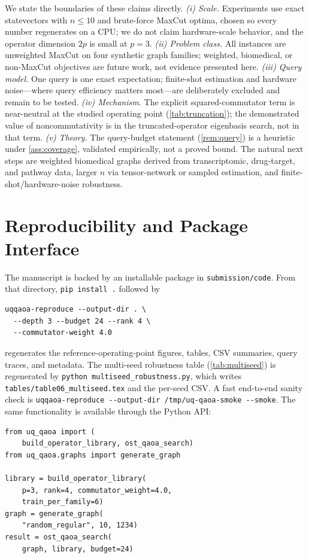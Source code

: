 \documentclass[aps,prresearch,reprint,amsmath,amssymb,floatfix,nofootinbib,superscriptaddress,longbibliography]{revtex4-2}
\theoremstyle{remark}
\begin{document}
We state the boundaries of these claims directly.
\emph{(i) Scale.}  Experiments use exact statevectors with \(n\le10\) and
brute-force MaxCut optima, chosen so every number regenerates on a CPU; we do not
claim hardware-scale behavior, and the operator dimension \(2p\) is small at
\(p{=}3\).
\emph{(ii) Problem class.}  All instances are unweighted MaxCut on four synthetic
graph families; weighted, biomedical, or non-MaxCut objectives are future work,
not evidence presented here.
\emph{(iii) Query model.}  One query is one exact expectation; finite-shot
estimation and hardware noise---where query efficiency matters most---are
deliberately excluded and remain to be tested.
\emph{(iv) Mechanism.}  The explicit squared-commutator term is near-neutral at
the studied operating point (\cref{tab:truncation}); the demonstrated value of
noncommutativity is in the truncated-operator eigenbasis search, not in that
term.
\emph{(v) Theory.}  The query-budget statement (\cref{rem:query}) is a heuristic
under \cref{ass:coverage}, validated empirically, not a proved bound.
The natural next steps are weighted biomedical graphs derived from
transcriptomic, drug-target, and pathway data, larger \(n\) via tensor-network or
sampled estimation, and finite-shot/hardware-noise robustness.

\section{Reproducibility and Package Interface}

The manuscript is backed by an installable package in \texttt{submission/code}.
From that directory, \texttt{pip install .} followed by
\begin{verbatim}
uqqaoa-reproduce --output-dir . \
  --depth 3 --budget 24 --rank 4 \
  --commutator-weight 4.0
\end{verbatim}
regenerates the reference-operating-point figures, tables, CSV summaries, query
traces, and metadata.  The multi-seed robustness table (\cref{tab:multiseed}) is
regenerated by \texttt{python multiseed\_robustness.py}, which writes
\texttt{tables/table06\_multiseed.tex} and the per-seed CSV.  A fast end-to-end
sanity check is \texttt{uqqaoa-reproduce -{}-output-dir /tmp/uq-qaoa-smoke
-{}-smoke}.  The same functionality is available through the Python API:
\begin{verbatim}
from uq_qaoa import (
    build_operator_library, ost_qaoa_search)
from uq_qaoa.graphs import generate_graph

library = build_operator_library(
    p=3, rank=4, commutator_weight=4.0,
    train_per_family=6)
graph = generate_graph(
    "random_regular", 10, 1234)
result = ost_qaoa_search(
    graph, library, budget=24)
\end{verbatim}
\end{document}
